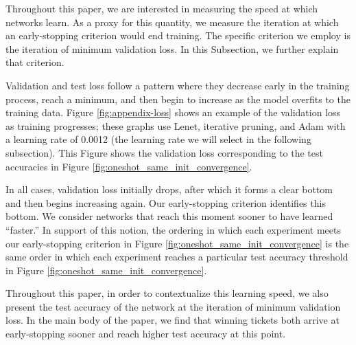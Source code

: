 Throughout this paper, we are interested in measuring the speed at which networks learn.
As a proxy for this quantity, we measure the iteration at which an early-stopping criterion would end training.
The specific criterion we employ is the iteration of minimum validation loss. In this Subsection, we further explain that criterion.

Validation and test loss follow a pattern where they decrease early in the training process, reach a minimum, and then begin to increase as
the model overfits to the training data. Figure \ref{fig:appendix-loss} shows an example of the validation loss as training progresses; these graphs use Lenet,
iterative pruning, and Adam with a learning rate of 0.0012 (the learning rate we will select in the following subsection). This Figure
shows the validation loss corresponding to the test accuracies in Figure \ref{fig:oneshot_same_init_convergence}.

In all cases, validation loss initially drops, after which it forms a clear bottom and then begins increasing again.
Our early-stopping criterion identifies this bottom. We consider networks that reach this moment sooner to have learned ``faster.''
In support of this notion, the ordering in which each experiment meets our early-stopping criterion in Figure \ref{fig:oneshot_same_init_convergence} is the same order in which each experiment reaches a particular test accuracy
threshold in Figure \ref{fig:oneshot_same_init_convergence}.

Throughout this paper, in order to contextualize this learning speed, we also present the test accuracy of the network at the iteration of minimum validation loss.
In the main body of the paper, we find that winning tickets both arrive at early-stopping sooner and reach higher test accuracy at this point.